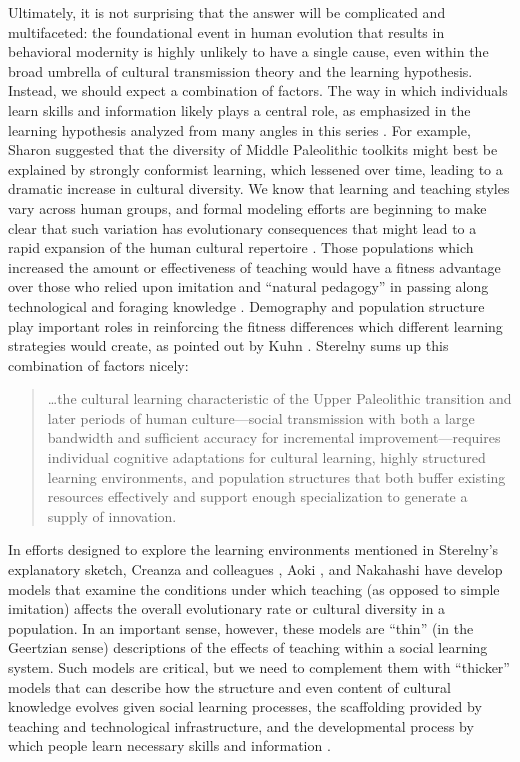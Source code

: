 \documentclass[referee,graybox,natbib]{svmult}
\begin{document}
Ultimately, it is not surprising that the answer will be complicated and
multifaceted: the foundational event in human evolution that results in
behavioral modernity is highly unlikely to have a single cause, even
within the broad umbrella of cultural transmission theory and the
learning hypothesis. Instead, we should expect a combination of factors.
The way in which individuals learn skills and information likely plays a
central role, as emphasized in the learning hypothesis analyzed from
many angles in this series
\citep{Aoki2013Determinants-of, Nishiaki2013Introduction}. For example,
Sharon \citeyearpar{sharon2009acheulian} suggested that the diversity of
Middle Paleolithic toolkits might best be explained by strongly
conformist learning, which lessened over time, leading to a dramatic
increase in cultural diversity. We know that learning and teaching
styles vary across human groups, and formal modeling efforts are
beginning to make clear that such variation has evolutionary
consequences that might lead to a rapid expansion of the human cultural
repertoire \citep{Nakahashi2013Cultural-Evolut}. Those populations which
increased the amount or effectiveness of teaching would have a fitness
advantage over those who relied upon imitation and ``natural pedagogy''
in passing along technological and foraging knowledge
\citep{Csibra:2011dx, Fogarty:2011gv, Terashima2013The-Evolutionar}.
Demography and population structure play important roles in reinforcing
the fitness differences which different learning strategies would
create, as pointed out by Kuhn \citeyearpar{Kuhn2013Cultural-Transm}.
Sterelny \citeyearpar[p.61]{sterelny2012evolved} sums up this
combination of factors nicely:

\begin{quote}
\ldots{}the cultural learning characteristic of the Upper Paleolithic
transition and later periods of human culture---social transmission with
both a large bandwidth and sufficient accuracy for incremental
improvement---requires individual cognitive adaptations for cultural
learning, highly structured learning environments, and population
structures that both buffer existing resources effectively and support
enough specialization to generate a supply of innovation.
\end{quote}

In efforts designed to explore the learning environments mentioned in
Sterelny's explanatory sketch, Creanza and colleagues
\citeyearpar{Creanza2013Exploring-Cultu}, Aoki
\citeyearpar{Aoki2013Determinants-of}, and Nakahashi
\citeyearpar{Nakahashi2013Cultural-Evolut} have develop models that
examine the conditions under which teaching (as opposed to simple
imitation) affects the overall evolutionary rate or cultural diversity
in a population. In an important sense, however, these models are
``thin'' (in the Geertzian sense) descriptions of the effects of
teaching within a social learning system. Such models are critical, but
we need to complement them with ``thicker'' models that can describe how
the structure and even content of cultural knowledge evolves given
social learning processes, the scaffolding provided by teaching and
technological infrastructure, and the developmental process by which
people learn necessary skills and information \citep{wimsatt2014}.
\end{document}
